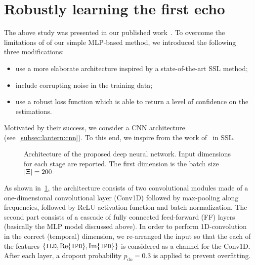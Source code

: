 \section{Robustly learning the first echo}\label{sec:lantern:robust}
The above study was presented in our published work~.
To overcome the limitations of of our simple \ac{MLP}-based method, we introduced the following three modifications:
\begin{itemize}
    \item use a more elaborate architecture inspired by a state-of-the-art SSL method;
    \item include corrupting noise in the training data;
    \item use a robust loss function which is able to return a level of confidence on the estimations.
\end{itemize}
Motivated by their success, we consider a \ac{CNN} architecture (see~\cref{subsec:lantern:cnn}).
To this end, we inspire from the work of~ in \ac{SSL}.
\begin{figure}[h]
    \begin{fullwidth}
        \centering
        \resizebox{\linewidth}{!}{
            
        }
        \caption{Architecture of the proposed deep neural network.
        Input dimensions for each stage are reported.
        The first dimension is the batch size $\kvbar{\Xi} = 200$}
        \label{fig:lantern:cnn}
    \end{fullwidth}
\end{figure}
As shown in~\cref{fig:lantern:cnn}, the architecture consists of two convolutional modules made of a one-dimensional convolutional layer (Conv1D) followed by max-pooling along frequencies, followed by \ac{ReLU} activation function and batch-normalization.
The second part consists of a cascade of fully connected feed-forward (FF) layers (basically the \ac{MLP} model discussed above).
In order to perform 1D-convolution in the correct (temporal) dimension, we re-arranged the input so that the each of the features $\set{ \ild, \kRe\set{\ipd}, \kIm\set{\ipd}}$ is considered as a channel for the Conv1D.
After each layer, a dropout probability $p_\text{do} = 0.3$ is applied to prevent overfitting.

\mynewline
